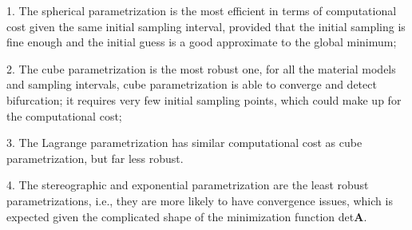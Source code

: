 \documentclass[12pt]{article}
\newcommand{\tensor}[1]{\ensuremath{\boldsymbol{#1}}}
\numberwithin{equation}{section}
\begin{document}
1. The spherical parametrization is the most efficient in terms of
computational cost given the same initial sampling interval, provided
that the initial sampling is fine enough and the initial guess is a
good approximate to the global minimum;

2. The cube parametrization is the most robust one, for all the
material models and sampling intervals, cube parametrization is able
to converge and detect bifurcation; it requires very few initial
sampling points, which could make up for the computational cost;

3. The Lagrange parametrization has similar computational cost as cube
parametrization, but far less robust.

4. The stereographic and exponential parametrization are the least
robust parametrizations, i.e., they are more likely to have
convergence issues, which is expected given the complicated shape of
the minimization function det$\tensor A$.



\end{document}
